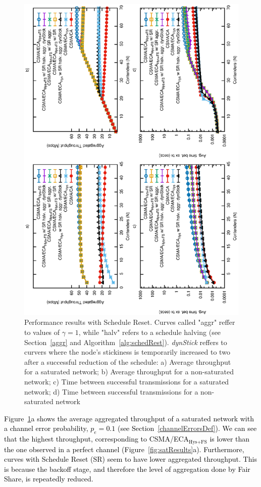 	\begin{figure}[tb]
		\centering
		\includegraphics[width=0.65\linewidth,angle=-90]{figures/tonFigs/schedReset-combined.eps}
		\caption{Performance results with Schedule Reset. Curves called "aggr" reffer to values of $\gamma=1$, while "halv" refers to a schedule halving (see Section~\ref{aggr} and Algorithm~\ref{alg:schedRest}). \emph{dynStick} reffers to curvers where the node's stickiness is temporarily increased to two after a successful reduction of the schedule: a) Average throughput for a saturated network; b) Average throughput for a non-saturated network; c) Time between successful transmissions for a saturated network; d) Time between successful transmissions for a non-saturated network}
		\label{fig:SchedResetResults}
	\end{figure}
	
	\textcolor{black}{Figure~\ref{fig:SchedResetResults}a shows the average aggregated throughput of a saturated network with a channel error probability, $p_e=0.1$ (see Section~\ref{channelErrorsDef}). We can see that the highest throughput, corresponding to CSMA/ECA$_{\text{Hys+FS}}$ is lower than the one observed in a perfect channel (Figure~\ref{fig:satResults}a). Furthermore, curves with Schedule Reset (SR) seem to have lower aggregated throughput. This is because the backoff stage, and therefore the level of aggregation done by Fair Share, is repeatedly reduced.}
	
